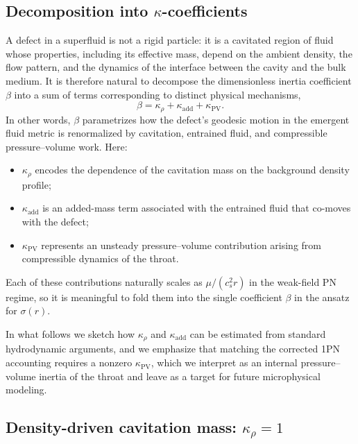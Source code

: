\documentclass[11pt]{article}
\newcommand{\cS}{c_s}
\begin{document}
\subsection{Decomposition into \texorpdfstring{$\kappa$}{kappa}-coefficients}
\label{sec:hydro_beta_decomposition}

A defect in a superfluid is not a rigid particle: it is a cavitated region of fluid whose properties, including its effective mass, depend on the ambient density, the flow pattern, and the dynamics of the interface between the cavity and the bulk medium. It is therefore natural to decompose the dimensionless inertia coefficient $\beta$ into a sum of terms corresponding to distinct physical mechanisms,
\begin{equation}
  \beta = \kappa_\rho + \kappa_{\mathrm{add}} + \kappa_{\mathrm{PV}}.
  \label{eq:beta_decomp}
\end{equation}
In other words, $\beta$ parametrizes how the defect's geodesic motion in the emergent fluid metric is renormalized by cavitation, entrained fluid, and compressible pressure--volume work.
Here:
\begin{itemize}
  \item $\kappa_\rho$ encodes the dependence of the cavitation mass on the background density profile;
  \item $\kappa_{\mathrm{add}}$ is an added-mass term associated with the entrained fluid that co-moves with the defect;
  \item $\kappa_{\mathrm{PV}}$ represents an unsteady pressure--volume contribution arising from compressible dynamics of the throat.
\end{itemize}
Each of these contributions naturally scales as $\mu/(\cS^2 r)$ in the weak-field PN regime, so it is meaningful to fold them into the single coefficient $\beta$ in the ansatz for $\sigma(r)$.

In what follows we sketch how $\kappa_\rho$ and $\kappa_{\mathrm{add}}$ can be estimated from standard hydrodynamic arguments, and we emphasize that matching the corrected 1PN accounting requires a nonzero $\kappa_{\mathrm{PV}}$, which we interpret as an internal pressure--volume inertia of the throat and leave as a target for future microphysical modeling.

\subsection{Density-driven cavitation mass: \texorpdfstring{$\kappa_\rho = 1$}{kappa\_rho = 1}}
\label{sec:hydro_kappa_rho}
\end{document}
